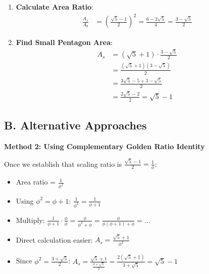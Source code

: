 \documentclass[12pt]{article}
\begin{document}
\begin{solutionbox}
\begin{enumerate}[leftmargin=*]
    \item \textbf{Calculate Area Ratio}: 
    \begin{align*}
    \frac{A_s}{A_b} &= \left(\frac{\sqrt{5}-1}{2}\right)^2 = \frac{6-2\sqrt{5}}{4} = \frac{3-\sqrt{5}}{2}
    \end{align*}
    
    \item \textbf{Find Small Pentagon Area}: 
    \begin{align*}
    A_s &= (\sqrt{5}+1) \cdot \frac{3-\sqrt{5}}{2}\\
    &= \frac{(\sqrt{5}+1)(3-\sqrt{5})}{2}\\
    &= \frac{3\sqrt{5} - 5 + 3 - \sqrt{5}}{2}\\
    &= \frac{2\sqrt{5} - 2}{2} = \sqrt{5} - 1
    \end{align*}
\end{enumerate}

\subsection*{B. Alternative Approaches}

\textbf{Method 2: Using Complementary Golden Ratio Identity}

Once we establish that scaling ratio is $\frac{\sqrt{5}-1}{2} = \frac{1}{\phi}$:
\begin{itemize}
    \item Area ratio = $\frac{1}{\phi^2}$
    \item Using $\phi^2 = \phi + 1$: $\frac{1}{\phi^2} = \frac{1}{\phi+1}$
    \item Multiply: $\frac{1}{\phi+1} \cdot \frac{\phi}{\phi} = \frac{\phi}{\phi^2+\phi} = \frac{\phi}{\phi(\phi+1)+\phi} = ...$
    \item Direct calculation easier: $A_s = \frac{\sqrt{5}+1}{\phi^2}$
    \item Since $\phi^2 = \frac{3+\sqrt{5}}{2}$: $A_s = \frac{\sqrt{5}+1}{\frac{3+\sqrt{5}}{2}} = \frac{2(\sqrt{5}+1)}{3+\sqrt{5}} = \sqrt{5}-1$
\end{itemize}

\end{solutionbox}
\end{document}

